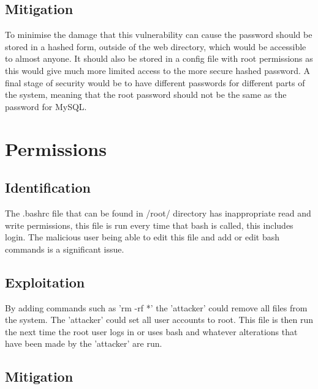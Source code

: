 \documentclass[paper=a4, fontsize=11pt]{scrartcl}
\numberwithin{equation}{section}		%
\numberwithin{figure}{section}			%
\numberwithin{table}{section}				%
\begin{document}
\subsection*{Mitigation}


To minimise the damage that this vulnerability can cause the password should be stored in a hashed form, outside of the web directory, which would be accessible to almost anyone. It should also be stored in a config file with root permissions as this would give much more limited access to the more secure hashed password. A final stage of security would be to have different passwords for different parts of the system, meaning that the root password should not be the same as the password for MySQL.

\section*{Permissions}
\subsection*{Identification}


The .bashrc file that can be found in /root/ directory has inappropriate read and write permissions, this file is run every time that bash is called, this includes login. The malicious user being able to edit this file and add or edit bash commands is a significant issue.

\subsection*{Exploitation}


By adding commands such as 'rm -rf *' the 'attacker' could remove all files from the system. The 'attacker' could set all user accounts to root. This file is then run the next time the root user logs in or uses bash and whatever alterations that have been made by the 'attacker' are run.

\subsection*{Mitigation}
\end{document}
